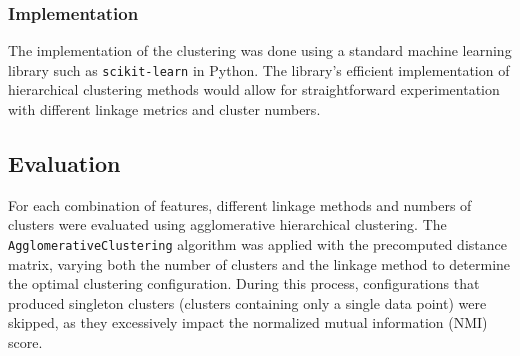 \subsubsection{Implementation}
The implementation of the clustering was done using a standard machine learning library such as \texttt{scikit-learn} in Python. The library’s efficient implementation of hierarchical clustering methods would allow for straightforward experimentation with different linkage metrics and cluster numbers.

\subsection{Evaluation}
For each combination of features, different linkage methods and numbers of clusters were evaluated using agglomerative hierarchical clustering. The \texttt{AgglomerativeClustering} algorithm was applied with the precomputed distance matrix, varying both the number of clusters and the linkage method to determine the optimal clustering configuration. During this process, configurations that produced singleton clusters (clusters containing only a single data point) were skipped, as they excessively impact the normalized mutual information (NMI) score.

